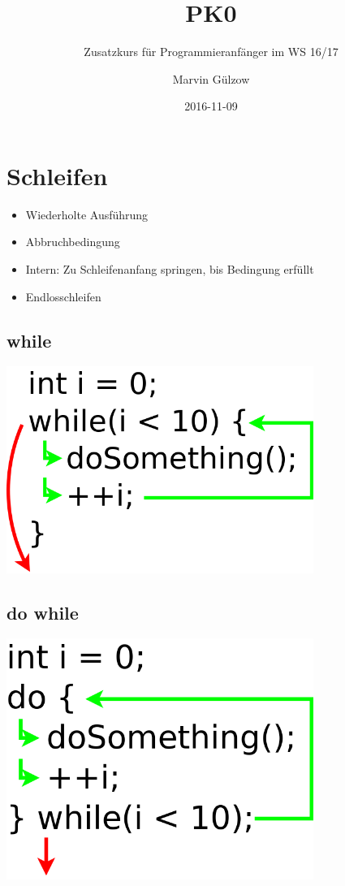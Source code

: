 \documentclass{beamer}
\title{PK0}
\subtitle{Zusatzkurs für Programmieranfänger im WS 16/17}
\author{Marvin Gülzow}
\institute{Universität Konstanz}
\date{2016-11-09}
\begin{document}
\frame{\maketitle}
\section{Schleifen}
\begin{frame}{\secname}
  \begin{itemize}
  \item Wiederholte Ausführung
  \item Abbruchbedingung
  \item Intern: Zu Schleifenanfang springen, bis Bedingung erfüllt
  \item Endlosschleifen
  \end{itemize}
\end{frame}

\subsection{while}
\begin{frame}{\subsecname}
  \includegraphics[width=0.75\textwidth]{img/while.png}
\end{frame}

\subsection{do while}
\begin{frame}{\subsecname}
  \includegraphics[width=0.75\textwidth]{img/dowhile.png}
\end{frame}
\end{document}
